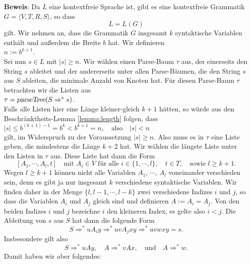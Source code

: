 \noindent
\textbf{Beweis}:  Da $L$ eine kontextfreie Sprache ist, gibt es eine kontextfreie
Grammatik $G = \langle V, T, R, S \rangle$, so dass 
\[ L = L(G) \]
gilt. Wir nehmen an, dass die Grammatik $G$ insgesamt $k$ syntaktische Variablen enth\"alt
und au{\ss}erdem die 
Breite $b$ hat.  Wir definieren
\\[0.2cm]
\hspace*{1.3cm}
$n := b^{k+1}$. 
\\[0.2cm] 
Sei nun $s \in L$ mit $|s| \geq n$.  Wir w\"ahlen einen Parse-Baum $\tau$ aus, der einerseits
den String $s$ ableitet und der andererseits unter allen Parse-B\"aumen, die den String $s$
aus $S$ ableiten, die minimale Anzahl von Knoten hat.  F\"ur diesen Parse-Baum $\tau$
betrachten wir die Listen aus
\\[0.2cm]
\hspace*{1.3cm}
$\tau = \textsl{parseTree}(S \Rightarrow^* s)$. 
\\[0.2cm] 
Falls alle Listen hier eine L\"ange kleiner-gleich $k+1$ h\"atten, so w\"urde aus den Beschr\"anktheits-Lemma
\ref{lemma:length} folgen, dass  
\\[0.2cm]
\hspace*{1.3cm}
$ |s| \leq b^{(k+1)-1} = b^k < b^{k+1} = n, \quad \mbox{also} \quad |s| < n$
\\[0.2cm] 
gilt, im Widerspruch zu der Voraussetzung $|s| \geq n$.  Also muss es in 
$\tau$ eine Liste geben, die mindestens die L\"ange $k + 2$
hat.  Wir w\"ahlen die l\"angste Liste unter den  Listen in $\tau$ aus.
Diese Liste hat dann die Form
\[ [A_1, \cdots, A_l, t] \quad \mbox{mit $A_i \in V$ f\"ur alle $i \in \{1,\cdots,l\}$},\quad t \in T,
   \quad \mbox{sowie $l \geq k+1$}.
 \]
Wegen $l \geq k + 1$  k\"onnen nicht alle Variablen $A_1$, $\cdots$, $A_l$
voneinander verschieden sein, denn es gibt ja nur insgesamt $k$ verschiedene syntaktische
Variablen.   Wir finden daher in der Menge $\{ l, l-1, \cdots, l-k \}$
zwei verschiedene Indizes $i$ und $j$,  so dass die Variablen $A_i$ und $A_j$ gleich sind und definieren
$A := A_i = A_j$.  Von den beiden Indizes $i$ und $j$ bezeichne $i$ den kleineren Index,
es gelte also $i < j$.   Die Ableitung von $s$ aus $S$ hat dann die folgende Form
\[ S \Rightarrow^* u A_i y \Rightarrow^* u v A_j x y \Rightarrow^* u v w x y = s. \] 
Insbesondere gilt also
\[ S \Rightarrow^* u A y, \quad A \Rightarrow^* vAx, \quad \mbox{und} \quad A \Rightarrow^* w. \]
Damit haben wir aber folgendes:
